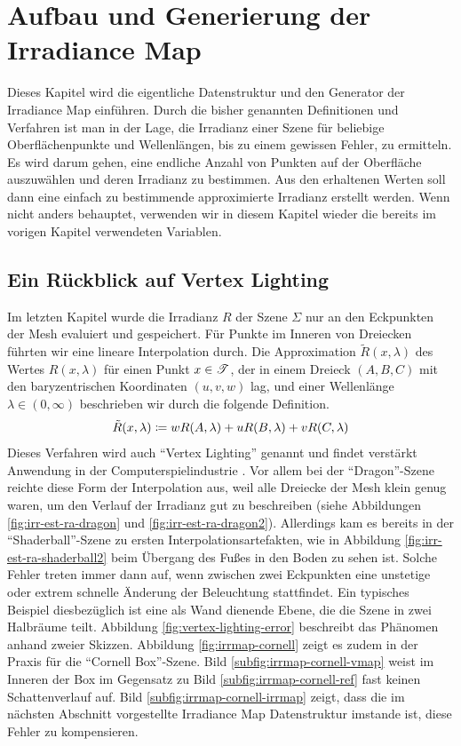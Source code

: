 \section{Aufbau und Generierung der Irradiance Map} %
\label{sec:aufbau_und_generierung_der_irradiance_map}

	Dieses Kapitel wird die eigentliche Datenstruktur und den Generator der Irradiance Map einführen.
	Durch die bisher genannten Definitionen und Verfahren ist man in der Lage, die Irradianz einer Szene für beliebige Oberflächenpunkte und Wellenlängen, bis zu einem gewissen Fehler, zu ermitteln.
	Es wird darum gehen, eine endliche Anzahl von Punkten auf der Oberfläche auszuwählen und deren Irradianz zu bestimmen.
	Aus den erhaltenen Werten soll dann eine einfach zu bestimmende approximierte Irradianz erstellt werden.
	Wenn nicht anders behauptet, verwenden wir in diesem Kapitel wieder die bereits im vorigen Kapitel verwendeten Variablen.

	\subsection{Ein Rückblick auf Vertex Lighting} %
	\label{sub:rückblick_auf_vertex_lighting}

		Im letzten Kapitel wurde die Irradianz $R$ der Szene $\Sigma$ nur an den Eckpunkten der Mesh evaluiert und gespeichert.
		Für Punkte im Inneren von Dreiecken führten wir eine lineare Interpolation durch.
		Die Approximation $\tilde{R}(x,\lambda)$ des Wertes $R(x,\lambda)$ für einen Punkt $x\in\mathscr{T}$, der in einem Dreieck $(A,B,C)$ mit den baryzentrischen Koordinaten $(u,v,w)$ lag, und einer Wellenlänge $\lambda\in (0,\infty)$ beschrieben wir durch die folgende Definition.
		\[
			\tilde{R}(x,\lambda) \coloneqq w R(A,\lambda) + u R(B,\lambda) + v R(C,\lambda)
		\]
		Dieses Verfahren wird auch \enquote{Vertex Lighting} genannt und findet verstärkt Anwendung in der Computerspielindustrie \cite{tricks-game}.
		Vor allem bei der \enquote{Dragon}-Szene reichte diese Form der Interpolation aus, weil alle Dreiecke der Mesh klein genug waren, um den Verlauf der Irradianz gut zu beschreiben (siehe Abbildungen \ref{fig:irr-est-ra-dragon} und \ref{fig:irr-est-ra-dragon2}).
		Allerdings kam es bereits in der \enquote{Shaderball}-Szene zu ersten Interpolationsartefakten, wie in Abbildung \ref{fig:irr-est-ra-shaderball2} beim Übergang des Fußes in den Boden zu sehen ist.
		Solche Fehler treten immer dann auf, wenn zwischen zwei Eckpunkten eine unstetige oder extrem schnelle Änderung der Beleuchtung stattfindet.
		Ein typisches Beispiel diesbezüglich ist eine als Wand dienende Ebene, die die Szene in zwei Halbräume teilt.
		Abbildung \ref{fig:vertex-lighting-error} beschreibt das Phänomen anhand zweier Skizzen.
		Abbildung \ref{fig:irrmap-cornell} zeigt es zudem in der Praxis für die \enquote{Cornell Box}-Szene.
		Bild \ref{subfig:irrmap-cornell-vmap} weist im Inneren der Box im Gegensatz zu Bild \ref{subfig:irrmap-cornell-ref} fast keinen Schattenverlauf auf.
		Bild \ref{subfig:irrmap-cornell-irrmap} zeigt, dass die im nächsten Abschnitt vorgestellte Irradiance Map Datenstruktur imstande ist, diese Fehler zu kompensieren.

